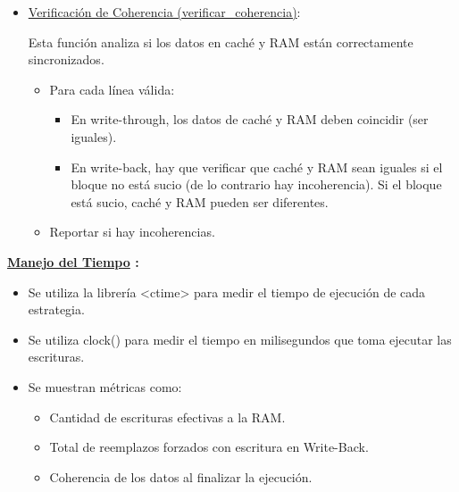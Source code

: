 \documentclass{article}
\begin{document}
\begin{itemize}
    \quad

    \item {\underline{Verificación de Coherencia (verificar\_coherencia)}:}

    \quad

        {Esta función analiza si los datos en caché y RAM están correctamente sincronizados.}

        \begin{itemize}
            \item Para cada línea válida:

                \begin{itemize}
                    \item En write-through, los datos de caché y RAM deben coincidir (ser iguales).
                    \item En write-back, hay que verificar que caché y RAM sean iguales si el bloque no está sucio (de lo contrario hay incoherencia). Si el bloque está sucio, caché y RAM pueden ser diferentes.
                \end{itemize}
            
            \item Reportar si hay incoherencias.
        \end{itemize}

    \quad
        
\end{itemize}   

\textbf{ \underline{Manejo del Tiempo} :}

\quad

\begin{itemize}
    \item Se utiliza la librería <ctime> para medir el tiempo de ejecución de cada estrategia.
    \item Se utiliza clock() para medir el tiempo en milisegundos que toma ejecutar las escrituras.
    \item Se muestran métricas como:
        \begin{itemize}
            \item Cantidad de escrituras efectivas a la RAM.
            \item Total de reemplazos forzados con escritura en Write-Back.
            \item Coherencia de los datos al finalizar la ejecución.
        \end{itemize}            
\end{itemize}
\end{document}
